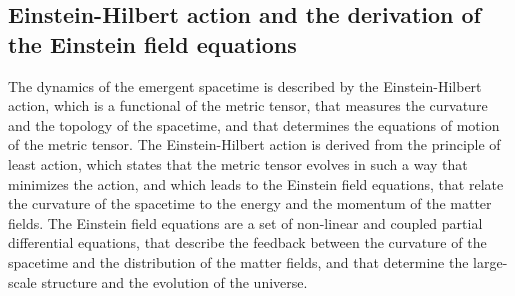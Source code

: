 \subsection{Einstein-Hilbert action and the derivation of the Einstein field equations}
The dynamics of the emergent spacetime is described by the Einstein-Hilbert action, which is a functional of the metric tensor, that measures the curvature and the topology of the spacetime, and that determines the equations of motion of the metric tensor. The Einstein-Hilbert action is derived from the principle of least action, which states that the metric tensor evolves in such a way that minimizes the action, and which leads to the Einstein field equations, that relate the curvature of the spacetime to the energy and the momentum of the matter fields. The Einstein field equations are a set of non-linear and coupled partial differential equations, that describe the feedback between the curvature of the spacetime and the distribution of the matter fields, and that determine the large-scale structure and the evolution of the universe.


